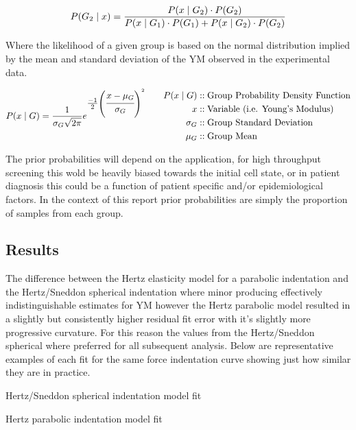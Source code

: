\documentclass[
  paper=a4,
  ,captions=tableheading
]{scrartcl}
\makeatletter
\newcommand*\pandocbounded[1]{%
  \sbox\pandoc@box{#1}%
  \Gscale@div\@tempa{\textheight}{\dimexpr\ht\pandoc@box+\dp\pandoc@box\relax}%
  \Gscale@div\@tempb{\linewidth}{\wd\pandoc@box}%
  \ifdim\@tempb\p@<\@tempa\p@\let\@tempa\@tempb\fi%
  \ifdim\@tempa\p@<\p@\scalebox{\@tempa}{\usebox\pandoc@box}%
  \else\usebox{\pandoc@box}%
  \fi%
}
\renewenvironment{quote}{\begin{customblockquote}\list{}{\rightmargin=0em\leftmargin=0em}%
\item\relax\color{blockquote-text}\ignorespaces}{\unskip\unskip\endlist\end{customblockquote}}
\makeatother
\begin{document}
\[\large P(G_2 \mid x) = \frac{P(x \mid G_2) \cdot P(G_2)}{P(x \mid G_1) \cdot P(G_1) + P(x \mid G_2) \cdot P(G_2)}\]

Where the likelihood of a given group is based on the normal
distribution implied by the mean and standard deviation of the YM
observed in the experimental data.

\[
{\large  
P(x \mid G) =  
\frac{1}{\sigma_{G} \sqrt{2 \pi}}  
e^{\tfrac{-1}{2}  
\left( \cfrac{x-\mu_{G}}{\sigma_{G}}\right)^{2}}  
}  
\qquad  
\begin{align}  
P(x \mid G) &:: \text{Group Probability Density Function}\\
x           &:: \text{Variable (i.e. Young's Modulus)}\\
\sigma_{G}  &:: \text{Group Standard Deviation}\\
\mu_{G}     &:: \text{Group Mean}\\
\end{align}
\]

The prior probabilities will depend on the application, for high
throughput screening this wold be heavily biased towards the initial
cell state, or in patient diagnosis this could be a function of patient
specific and/or epidemiological factors. In the context of this report
prior probabilities are simply the proportion of samples from each
group.

\subsection{Results}\label{results}

The difference between the Hertz elasticity model for a parabolic
indentation and the Hertz/Sneddon spherical indentation where minor
producing effectively indistinguishable estimates for YM however the
Hertz parabolic model resulted in a slightly but consistently higher
residual fit error with it's slightly more progressive curvature. For
this reason the values from the Hertz/Sneddon spherical where preferred
for all subsequent analysis. Below are representative examples of each
fit for the same force indentation curve showing just how similar they
are in practice.

\noindent
\begin{minipage}[t]{0.48\textwidth}
\begin{quote}
\pandocbounded{}
Hertz/Sneddon spherical indentation model fit
\end{quote}
\end{minipage}
\hfill
\begin{minipage}[t]{0.48\textwidth}
\begin{quote}
\pandocbounded{}
Hertz parabolic indentation model fit
\end{quote}
\end{minipage}
\end{document}
